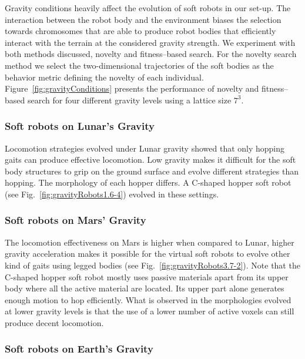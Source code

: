 \documentclass{sig-alternate}
\begin{document}
Gravity conditions heavily affect the evolution of soft robots in our set-up. The interaction between the robot body and the environment biases the selection towards chromosomes that are able to produce robot bodies that efficiently interact with the terrain at the considered gravity strength. We experiment with both methods discussed, novelty and fitness--based search. For the novelty search method we select the two-dimensional trajectories of the soft bodies as the behavior metric defining the novelty of each individual. Figure~\ref{fig:gravityConditions} presents the performance of novelty and fitness--based search for four different gravity levels using a lattice size $7^3$.

\subsubsection*{Soft robots on Lunar's Gravity}

Locomotion strategies evolved under Lunar gravity showed that only hopping gaits can produce effective locomotion. Low gravity makes it difficult for the soft body structures to grip on the ground surface and evolve different strategies than hopping. The morphology of each hopper differs. A C-shaped hopper soft robot (see Fig.~\ref{fig:gravityRobots1.6-4}) evolved in these settings.

\subsubsection*{Soft robots on Mars' Gravity}

The locomotion effectiveness on Mars is higher when compared to Lunar, higher gravity acceleration makes it possible for the virtual soft robots to evolve other kind of gaits using legged bodies (see Fig.~\ref{fig:gravityRobots3.7-2}). Note that the C-shaped hopper soft robot mostly uses passive materials apart from its upper body where all the active material are located. Its upper part alone generates enough motion to hop efficiently. What is observed in the morphologies evolved at lower gravity levels is that the use of a lower number of active voxels can still produce decent locomotion.

\subsubsection*{Soft robots on Earth's Gravity}
\end{document}
